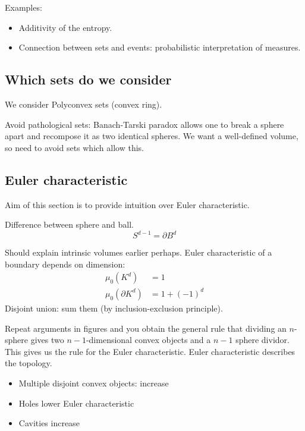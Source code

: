 Examples:
\begin{itemize}
\item Additivity of the entropy.
\item Connection between sets and events: probabilistic interpretation of measures.
\end{itemize}

\subsection{Which sets do we consider}

We consider Polyconvex sets (convex ring).

Avoid pathological sets: Banach-Tarski paradox allows one to break a sphere apart and recompose it as two identical spheres.
We want a well-defined volume, so need to avoid sets which allow this.

\subsection{Euler characteristic}

Aim of this section is to provide intuition over Euler characteristic.

\begin{tcolorbox}[title=A note on nomenclature]
  Difference between sphere and ball.
  \begin{equation*}
    S^{d-1} = \partial B^d
  \end{equation*}
\end{tcolorbox}

Should explain intrinsic volumes earlier perhaps.
Euler characteristic of a boundary depends on dimension:
\begin{align}
  \mu_0(K^d) &= 1 \\
  \mu_0(\partial K^d) &= 1 + (-1)^d
\end{align}
Disjoint union: sum them (by inclusion-exclusion principle).

Repeat arguments in figures and you obtain the general rule that dividing an $n$-sphere gives two $n-1$-dimensional convex objects and a $n-1$ sphere dividor.
This gives us the rule for the Euler characteristic.
Euler characteristic describes the topology.

\begin{itemize}
\item Multiple disjoint convex objects: increase
\item Holes lower Euler characteristic
\item Cavities increase
\end{itemize}

